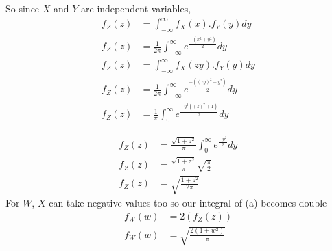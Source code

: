 \documentclass{beamer}
\begin{document}
     \begin{frame}
         So since $X$ and $Y$ are independent variables,
     \begin{align}
      f_{Z}(z)&=\int_{-\infty}^{\infty}f_{X}(x).f_{Y}(y)dy\\
      f_{Z}(z)&=\frac{1}{2\pi}\int_{-\infty}^{\infty}e^{\frac{-(x^{2}+y^{2})}{2}}dy\\
      f_{Z}(z)&=\int_{-\infty}^{\infty}f_{X}(zy).f_{Y}(y)dy\\
     f_{Z}(z)&=\frac{1}{2\pi}\int_{-\infty}^{\infty}e^{\frac{-((zy)^{2}+y^{2})}{2}}dy\\
     f_{Z}(z)&=\frac{1}{\pi}\int_{0}^{\infty}e^{\frac{-y^{2}((z)^{2}+1)}{2}}dy
     \end{align}
     \end{frame}
     \begin{frame}
     \begin{align}
      f_{Z}(z)&=\frac{\sqrt{1+z^{2}}}{\pi}\int_{0}^{\infty}e^{\frac{-y^{2}}{2}}dy\\
         f_{Z}(z)&=\frac{\sqrt{1+z^{2}}}{\pi}\sqrt{\frac{\pi}{2}}\\
         f_{Z}(z)&=\sqrt{\frac{1+z^{2}}{2\pi}}
     \end{align}
     For $W$, $X$ can take negative values too so our integral of (a) becomes double
     \begin{align}
          f_{W}(w)&=2( f_{Z}(z))\\
         f_{W}(w)&=\sqrt{\frac{2(1+w^{2})}{\pi}}
     \end{align}
     
     \end{frame}
     
\end{document}
